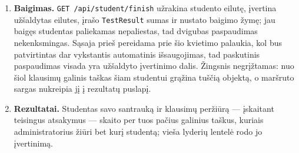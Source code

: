 \documentclass[11pt,a4paper]{article}
\newcommand{\code}[1]{\texttt{#1}}
\begin{document}
\begin{enumerate}
        gali užverti naršyklę ir tęsti prisijungęs su vardu ir kodu.
  \item \textbf{Baigimas.} \code{GET /api/student/finish} užrakina
        studento eilutę, įvertina užšaldytas eilutes, įrašo
        \code{TestResult} sumas ir nustato baigimo žymę; jau baigęs
        studentas paliekamas nepaliestas, tad dvigubas paspaudimas
        nekenksmingas. Sąsaja prieš pereidama prie šio kvietimo
        palaukia, kol bus patvirtintas dar vykstantis automatinis
        išsaugojimas, tad paskutinis paspaudimas visada yra užšaldyto
        įvertinimo dalis. Žingsnis negrįžtamas: nuo šiol klausimų
        galinis taškas šiam studentui
        grąžina tuščią objektą, o maršruto sargas nukreipia jį į
        rezultatų puslapį.
  \item \textbf{Rezultatai.} Studentas savo santrauką ir klausimų
        peržiūrą — įskaitant teisingus atsakymus — skaito per tuos
        pačius galinius taškus, kuriais administratorius žiūri bet
        kurį studentą; vieša lyderių lentelė rodo jo įvertinimą.
\end{enumerate}
\end{document}
